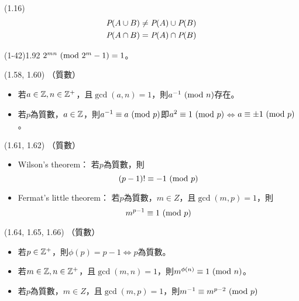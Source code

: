 \item \begin{theorem}{(1.16)} \begin{subequations}
    \begin{align}
        \P(A \cup B) & \neq \P(A) \cup \P(B) \\
        \P(A \cap B) & = \P(A) \cap \P(B)
    \end{align}
    \end{subequations}
\end{theorem}

\item \begin{theorem}{(1-42)1.92} $2^{mn} \Mod{2^m - 1} = 1$。
\end{theorem}

\item \begin{theorem}{(1.58, 1.60)} （質數）
    \begin{itemize}
        \item 若$a \in \Z, n \in \N$，且$\gcd(a, n) = 1$，則$a^{-1} \Mod{n}$存在。
        \item 若$p$為質數，$a \in \Z$，則$a^{-1} \equiv a \Mod{p}$即$a^2 \equiv 1 \Mod{p}$$\iff$$a \equiv \pm 1 \Mod{p}$。
    \end{itemize}
\end{theorem}

\item \begin{theorem}{(1.61, 1.62)} （質數）
    \begin{itemize}
        \item Wilson's theorem：
        若$p$為質數，則
        \begin{equation}
            (p - 1)! \equiv -1 \Mod{p}
        \end{equation}
        \item Fermat's little theorem：
        若$p$為質數，$m \in Z$，且$\gcd(m, p) = 1$，則
        \begin{equation}
            m^{p - 1} \equiv 1 \Mod{p}
        \end{equation}
    \end{itemize}
\end{theorem}

\item \begin{theorem}{(1.64, 1.65, 1.66)} （質數）
    \begin{itemize}
        \item 若$p \in \N$，則$\phi(p) = p - 1$$\iff$$p$為質數。
        \item 若$m \in \Z, n \in \N$，且$\gcd(m, n) = 1$，則$m^{\phi(n)} \equiv 1 \Mod{n}$。
        \item 若$p$為質數，$m \in Z$，且$\gcd(m, p) = 1$，則$m^{-1} \equiv m^{p - 2} \Mod{p}$
    \end{itemize}
\end{theorem}

